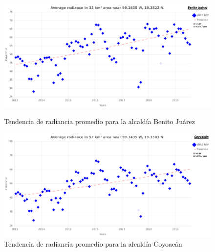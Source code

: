 \begin{figure}[H]
  \centering
    \includegraphics[width=1\textwidth]{BJ}
  \caption{Tendencia de radiancia promedio para la alcaldía Benito Juárez}
  \label{radiancetrendsbj}
\vspace{20mm} 
    \includegraphics[width=1\textwidth]{CO}
  \caption{Tendencia de radiancia promedio para la alcaldía Coyoacán}
  \label{radiancetrendsco}
\end{figure}
\blindtext

\newpage

